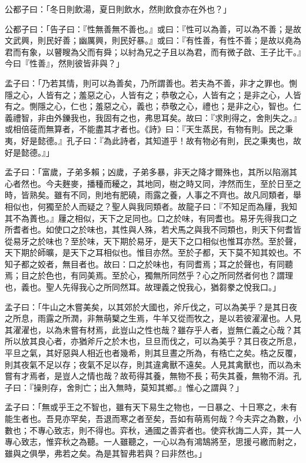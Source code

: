 \documentclass[12pt,a4paper]{ctexbook}
\begin{document}
公都子曰：「冬日則飲湯，夏日則飲水，然則飲食亦在外也？」\par
公都子曰：「告子曰：『性無善無不善也。』或曰：『性可以為善，可以為不善；是故文武興，則民好善；幽厲興，則民好暴。』或曰：『有性善，有性不善；是故以堯為君而有象，以瞽瞍為父而有舜；以紂為兄之子且以為君，而有微子啟、王子比干。』今曰『性善』，然則彼皆非與？」\par
孟子曰：「乃若其情，則可以為善矣，乃所謂善也。若夫為不善，非才之罪也。惻隱之心，人皆有之；羞惡之心，人皆有之；恭敬之心，人皆有之；是非之心，人皆有之。惻隱之心，仁也；羞惡之心，義也；恭敬之心，禮也；是非之心，智也。仁義禮智，非由外鑠我也，我固有之也，弗思耳矣。故曰：『求則得之，舍則失之。』或相倍蓰而無算者，不能盡其才者也。《詩》曰：『天生蒸民，有物有則。民之秉夷，好是懿德。』孔子曰：『為此詩者，其知道乎！故有物必有則，民之秉夷也，故好是懿德。』」\par
孟子曰：「富歲，子弟多賴；凶歲，子弟多暴，非天之降才爾殊也，其所以陷溺其心者然也。今夫麰麥，播種而耰之，其地同，樹之時又同，浡然而生，至於日至之時，皆熟矣。雖有不同，則地有肥磽，雨露之養，人事之不齊也。故凡同類者，舉相似也，何獨至於人而疑之？聖人與我同類者。故龍子曰：『不知足而為屨，我知其不為蕢也。』屨之相似，天下之足同也。口之於味，有同耆也。易牙先得我口之所耆者也。如使口之於味也，其性與人殊，若犬馬之與我不同類也，則天下何耆皆從易牙之於味也？至於味，天下期於易牙，是天下之口相似也惟耳亦然。至於聲，天下期於師曠，是天下之耳相似也。惟目亦然。至於子都，天下莫不知其姣也。不知子都之姣者，無目者也。故曰：口之於味也，有同耆焉；耳之於聲也，有同聽焉；目之於色也，有同美焉。至於心，獨無所同然乎？心之所同然者何也？謂理也，義也。聖人先得我心之所同然耳。故理義之悅我心，猶芻豢之悅我口。」\par
孟子曰：「牛山之木嘗美矣，以其郊於大國也，斧斤伐之，可以為美乎？是其日夜之所息，雨露之所潤，非無萌櫱之生焉，牛羊又從而牧之，是以若彼濯濯也。人見其濯濯也，以為未嘗有材焉，此豈山之性也哉？雖存乎人者，豈無仁義之心哉？其所以放其良心者，亦猶斧斤之於木也，旦旦而伐之，可以為美乎？其日夜之所息，平旦之氣，其好惡與人相近也者幾希，則其旦晝之所為，有梏亡之矣。梏之反覆，則其夜氣不足以存；夜氣不足以存，則其違禽獸不遠矣。人見其禽獸也，而以為未嘗有才焉者，是豈人之情也哉？故苟得其養，無物不長；苟失其養，無物不消。孔子曰：『操則存，舍則亡；出入無時，莫知其鄉。』惟心之謂與？」\par
孟子曰：「無或乎王之不智也，雖有天下易生之物也，一日暴之、十日寒之，未有能生者也。吾見亦罕矣，吾退而寒之者至矣，吾如有萌焉何哉？今夫弈之為數，小數也；不專心致志，則不得也。弈秋，通國之善弈者也。使弈秋誨二人弈，其一人專心致志，惟弈秋之為聽。一人雖聽之，一心以為有鴻鵠將至，思援弓繳而射之，雖與之俱學，弗若之矣。為是其智弗若與？曰非然也。」\par
\end{document}
